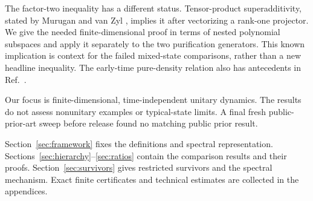 The factor-two inequality has a different status. Tensor-product
superadditivity, stated by Murugan and van Zyl
\cite[Sec.~2, Eq.~(2.4)]{MuruganVanZyl2026}, implies it after vectorizing a
rank-one projector. We give the needed finite-dimensional proof in terms of
nested polynomial subspaces and apply it separately to the two purification
generators. This known implication is context for the failed mixed-state
comparisons, rather than a new headline inequality. The early-time
pure-density relation also has antecedents in Ref.~\cite{Caputa2024}.

Our focus is finite-dimensional, time-independent unitary dynamics. The
results do not assess nonunitary examples or typical-state limits. A final fresh
public-prior-art sweep before release found no matching
public prior result.

Section~\ref{sec:framework} fixes the definitions and spectral representation.
Sections~\ref{sec:hierarchy}--\ref{sec:ratios} contain the comparison results
and their proofs. Section~\ref{sec:survivors} gives restricted survivors and
the spectral mechanism. Exact finite certificates and technical estimates
are collected in the appendices.
